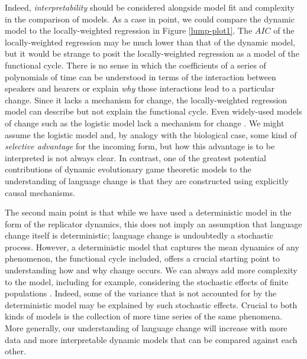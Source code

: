 \documentclass[linguex]{sp}
\theoremstyle{definition} \newtheorem{definition}{Definition}
\begin{document}
Indeed, \emph{interpretability} should be considered alongside model fit and complexity in the comparison of models. As a case in point, we could compare the dynamic model to the locally-weighted regression in Figure \ref{lump-plot1}. The $AIC$ of the locally-weighted regression may be much lower than that of the dynamic model, but it would be strange to posit the locally-weighted regression as a model of the functional cycle. There is no sense in which the coefficients of a series of polynomials of time can be understood in terms of the interaction between speakers and hearers or explain \emph{why} those interactions lead to a particular change.  Since it lacks a mechanism for change, the locally-weighted regression model can describe but not explain the functional cycle. Even widely-used models of change such as the logistic model lack a mechanism for change \citep[4]{kroch1989}. We might assume the logistic model and, by analogy with the biological case, some kind of \emph{selective advantage} for the incoming form, but how this advantage is to be interpreted is not always clear.  In contrast, one of the greatest potential contributions of dynamic evolutionary game theoretic models to the understanding of language change is that they are constructed using explicitly causal mechanisms.

The second main point is that while we have used a deterministic model in the form of the replicator dynamics, this does not imply an assumption that language change itself is deterministic; language change is undoubtedly a stochastic process.  However, a deterministic model that captures the mean dynamics of any phenomenon, the functional cycle included, offers a crucial starting point to understanding how and why change occurs.  We can always add more complexity to the model, including for example, considering the stochastic effects of finite populations \citep{moran1958,kimura1968}.  Indeed, some of the variance that is not accounted for by the deterministic model may be explained by such stochastic effects. Crucial to both kinds of models is the collection of more time series of the same phenomena. More generally, our understanding of language change will increase with more data and more interpretable dynamic models that can be compared against each other.



\end{document}
